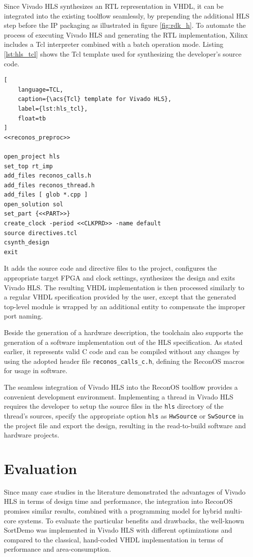 Since Vivado HLS synthesizes an \ac{RTL} representation in \ac{VHDL}, it can
be integrated into the existing toolflow seamlessly, by prepending the
additional \ac{HLS} step before the \ac{IP} packaging as illustrated in figure
\ref{fig:rdk_h}. To automate the process of executing Vivado HLS and
generating the \ac{RTL} implementation, Xilinx includes a \ac{Tcl} interpreter
combined with a batch operation mode. Listing \ref{lst:hls_tcl} shows the
\ac{Tcl} template used for synthesizing the developer's source code.
\begin{lstlisting}[
	language=TCL,
	caption={\acs{Tcl} template for Vivado HLS},
	label={lst:hls_tcl},
	float=tb
]
<<reconos_preproc>>

open_project hls
set_top rt_imp
add_files reconos_calls.h
add_files reconos_thread.h
add_files [ glob *.cpp ]
open_solution sol
set_part {<<PART>>}
create_clock -period <<CLKPRD>> -name default
source directives.tcl
csynth_design
exit
\end{lstlisting}
It adds the source code and directive files to the project, configures the
appropriate target \ac{FPGA} and clock settings, synthesizes the design and
exits Vivado HLS. The resulting \ac{VHDL} implementation is then processed
similarly to a regular \ac{VHDL} specification provided by the user, except
that the generated top-level module is wrapped by an additional entity to
compensate the improper port naming.

Beside the generation of a hardware description, the toolchain also
supports the generation of a software implementation out of the \ac{HLS}
specification. As stated earlier, it represents valid C code and can be
compiled without any changes by using the adopted header file
\lstinline{reconos_calls_c.h}, defining the ReconOS macros for usage in
software.

The seamless integration of Vivado HLS into the ReconOS toolflow provides a
convenient development environment. Implementing a thread in Vivado HLS
requires the developer to setup the source files in the \lstinline{hls}
directory of the thread's sources, specify the appropriate option
\lstinline{hls} as \lstinline{HwSource} or \lstinline{SwSource} in the project
file and export the design, resulting in the read-to-build software and
hardware projects.

\section{Evaluation}
Since many case studies in the literature demonstrated the advantages of
Vivado HLS in terms of design time and performance, the integration into
ReconOS promises similar results, combined with a programming model for hybrid
multi-core systems. To evaluate the particular benefits and drawbacks, the
well-known SortDemo was implemented in Vivado HLS with different optimizations
and compared to the classical, hand-coded \ac{VHDL} implementation in terms of
performance and area-consumption.

